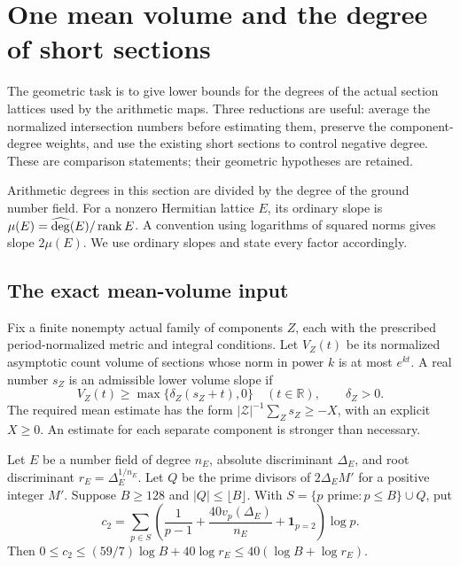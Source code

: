 \section{One mean volume and the degree of short sections}
\label{rh-geometry}

The geometric task is to give lower bounds for the degrees of the
actual section lattices used by the arithmetic maps. Three reductions
are useful: average the normalized intersection numbers before
estimating them, preserve the component-degree weights, and use the
existing short sections to control negative degree. These are
comparison statements; their geometric hypotheses are retained.

Arithmetic degrees in this section are divided by the degree of the
ground number field. For a nonzero Hermitian lattice $E$, its ordinary
slope is $\mu(E)=\widehat{\deg}(E)/\operatorname{rank} E$. A convention using logarithms
of squared norms gives slope $2\mu(E)$. We use ordinary slopes and
state every factor accordingly.

\subsection{The exact mean-volume input}

Fix a finite nonempty actual family of components $Z$, each with the prescribed
period-normalized metric and integral conditions. Let $V_Z(t)$ be
its normalized asymptotic count volume of sections whose norm in
power $k$ is at most $e^{kt}$. A real number $s_Z$ is an admissible
lower volume slope if
\begin{equation}\label{rh-volume-slope}
 V_Z(t)\ge\max\{\delta_Z(s_Z+t),0\}\quad(t\in\mathbb R),
 \qquad \delta_Z>0.
\end{equation}
The required mean estimate has the form
$|\mathcal Z|^{-1}\sum_Zs_Z\ge-X$, with an explicit $X\ge0$.
An estimate for each separate component is stronger than necessary.

\begin{lemma}\label{rh-prime-cost}
Let $E$ be a number field of degree $n_E$, absolute discriminant
$\Delta_E$, and root discriminant $r_E=\Delta_E^{1/n_E}$.
Let $Q$ be the prime divisors of $2\Delta_EM'$ for a positive
integer $M'$. Suppose $B\ge128$ and $|Q|\le\lfloor B\rfloor$.
With $S=\{p\text{ prime}:p\le B\}\cup Q$, put
\[
 c_2=\sum_{p\in S}\left(\frac1{p-1}
       +\frac{40v_p(\Delta_E)}{n_E}+\mathbf1_{p=2}\right)\log p.
\]
Then $0\le c_2\le(59/7)\log B+40\log r_E
\le40(\log B+\log r_E)$.
\end{lemma}

